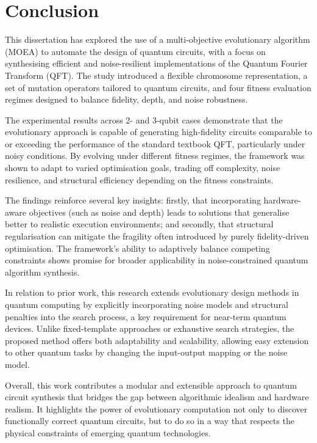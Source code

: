 \documentclass[11pt,a4paper]{article}
\begin{document}
\section{Conclusion}\label{sec:conclusion}
This dissertation has explored the use of a multi-objective evolutionary algorithm (MOEA) to automate the design of quantum circuits, with a focus on synthesising efficient and noise-resilient implementations of the Quantum Fourier Transform (QFT). The study introduced a flexible chromosome representation, a set of mutation operators tailored to quantum circuits, and four fitness evaluation regimes designed to balance fidelity, depth, and noise robustness.\newline

The experimental results across 2- and 3-qubit cases demonstrate that the evolutionary approach is capable of generating high-fidelity circuits comparable to or exceeding the performance of the standard textbook QFT, particularly under noisy conditions. By evolving under different fitness regimes, the framework was shown to adapt to varied optimisation goals,  trading off complexity, noise resilience, and structural efficiency depending on the fitness constraints.\newline

The findings reinforce several key insights: firstly, that incorporating hardware-aware objectives (such as noise and depth) leads to solutions that generalise better to realistic execution environments; and secondly, that structural regularisation can mitigate the fragility often introduced by purely fidelity-driven optimisation. The framework's ability to adaptively balance competing constraints shows promise for broader applicability in noise-constrained quantum algorithm synthesis.\newline

In relation to prior work, this research extends evolutionary design methods in quantum computing by explicitly incorporating noise models and structural penalties into the search process, a key requirement for near-term quantum devices. Unlike fixed-template approaches or exhaustive search strategies, the proposed method offers both adaptability and scalability, allowing easy extension to other quantum tasks by changing the input-output mapping or the noise model.\newline

Overall, this work contributes a modular and extensible approach to quantum circuit synthesis that bridges the gap between algorithmic idealism and hardware realism. It highlights the power of evolutionary computation not only to discover functionally correct quantum circuits, but to do so in a way that respects the physical constraints of emerging quantum technologies.\newpage
\end{document}
